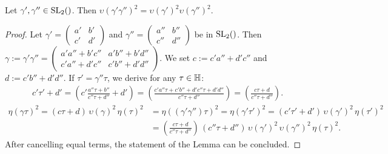 \documentclass{article}
\begin{document}
\begin{Hemmecke}
\begin{Lemma}
\label{thm:matix-splitting}
Let $\gamma',\gamma''\in \SL2Z$.
%
Then $\upsilon(\gamma'\gamma'')^2 = \upsilon(\gamma')^2 \upsilon(\gamma'')^2$.
\end{Lemma}
\begin{proof}
  Let
  $\gamma'=\left(\begin{smallmatrix}a'&b'\\c'&d'\end{smallmatrix}\right)$
  and
  $\gamma''=\left(\begin{smallmatrix}a''&b''\\c''&d''\end{smallmatrix}\right)$
  be in $\SL2Z$.
  Then
  $\gamma:=\gamma'\gamma'' =
  \left(
    \begin{smallmatrix}
      a'a''+b'c'' & a'b''+b'd''\\
      c'a''+d'c'' & c'b''+d'd''
    \end{smallmatrix}
  \right)$.
  We set $c:=c'a''+d'c''$ and $d:=c'b''+d'd''$.
%
  If $\tau'=\gamma''\tau$, we derive for any $\tau \in \mathbb{H}$:
  \begin{gather*}
    c' \tau' + d'
    =
      \left(c' \frac{a''\tau + b''}{c''\tau + d''} +d'\right)
    =
      \left(\frac{c'a''\tau + c'b''+ d'c''\tau + d'd''}{c''\tau + d''}\right)
    =
    \left(\frac{c\tau + d}{c''\tau + d''}\right).
  \end{gather*}
%
  \begin{align*}
    \eta(\gamma\tau)^2 = (c \tau + d)\,\upsilon(\gamma)^2\,\eta(\tau)^2
    &=
    \eta((\gamma'\gamma'')\tau)^2 =
    \eta(\gamma'\tau')^2
    =
      (c'\tau'+d')\,\upsilon(\gamma')^2\,\eta(\tau')^2\\
    &=
      \left(\frac{c\tau + d}{c''\tau + d''}\right) \,(c''\tau+d'')
      \,\upsilon(\gamma')^2\,\upsilon(\gamma'')^2\,\eta(\tau)^2.
  \end{align*}
  After cancelling equal terms, the statement of the Lemma can be
  concluded.
\end{proof}

\end{Hemmecke}
\end{document}
